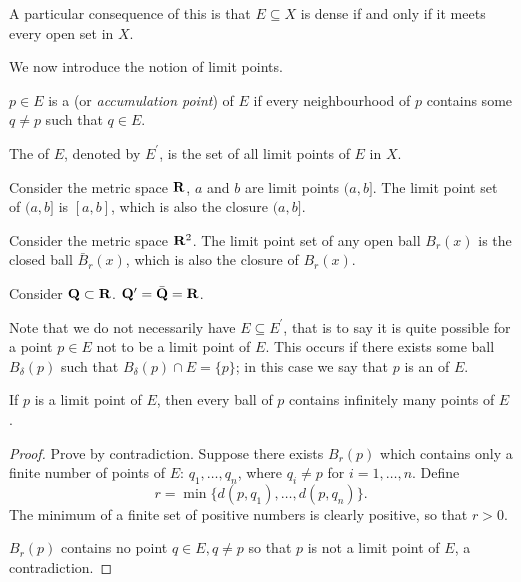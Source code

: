 \begin{remark}
A particular consequence of this is that $E\subseteq X$ is dense if and only if it meets every open set in $X$.
\end{remark}

We now introduce the notion of limit points.

\begin{definition}
$p\in E$ is a  (or \emph{accumulation point}) of $E$ if every neighbourhood of $p$ contains some $q\neq p$ such that $q\in E$.

The  of $E$, denoted by $E^\prime$, is the set of all limit points of $E$ in $X$.
\end{definition}

\begin{example}
Consider the metric space $\mathbf R$, $a$ and $b$ are limit points $(a,b]$. The limit point set of $(a,b]$ is $[a,b]$, which is also the closure $(a,b]$.

Consider the metric space $\mathbf R^2$. The limit point set of any open ball $B_r(x)$ is the closed ball $\bar{B}_r(x)$, which is also the closure of $B_r(x)$.

Consider $\mathbf Q\subset\mathbf R$. $\mathbf Q^\prime=\bar{\mathbf Q}=\mathbf R$.
\end{example}

Note that we do not necessarily have $E\subseteq E^\prime$, that is to say it is quite possible for a point $p\in E$ not to be a limit point of $E$. This occurs if there exists some ball $B_\delta(p)$ such that $B_\delta(p)\cap E=\{p\}$; in this case we say that $p$ is an  of $E$.

\begin{proposition}
If $p$ is a limit point of $E$, then every ball of $p$ contains infinitely many points of $E$.
\end{proposition}

\begin{proof}
Prove by contradiction. Suppose there exists $B_r(p)$ which contains only a finite number of points of $E$: $q_1,\dots,q_n$, where $q_i\neq p$ for $i=1,\dots,n$. Define
\[r=\min\{d(p,q_1),\dots,d(p,q_n)\}.\]
The minimum of a finite set of positive numbers is clearly positive, so that $r>0$.

$B_r(p)$ contains no point $q\in E,q\neq p$ so that $p$ is not a limit point of $E$, a contradiction.
\end{proof}

